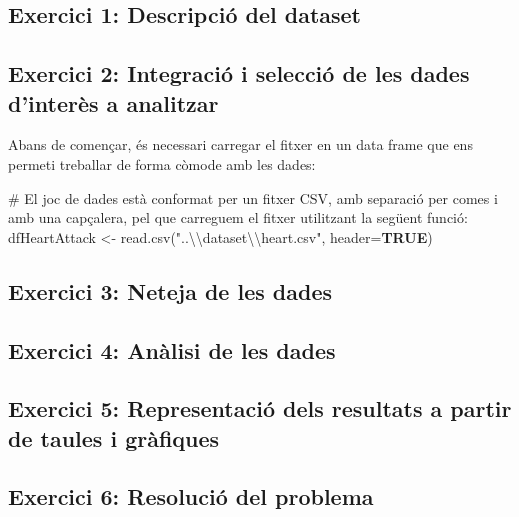 \documentclass[
]{article}
\newenvironment{Shaded}{\begin{snugshade}}{\end{snugshade}}
\newcommand{\AttributeTok}[1]{\textcolor[rgb]{0.80,0.80,0.80}{#1}}
\newcommand{\CommentTok}[1]{\textcolor[rgb]{0.50,0.62,0.50}{#1}}
\newcommand{\ConstantTok}[1]{\textcolor[rgb]{0.86,0.64,0.64}{\textbf{#1}}}
\newcommand{\FunctionTok}[1]{\textcolor[rgb]{0.94,0.94,0.56}{#1}}
\newcommand{\NormalTok}[1]{\textcolor[rgb]{0.80,0.80,0.80}{#1}}
\newcommand{\OtherTok}[1]{\textcolor[rgb]{0.94,0.94,0.56}{#1}}
\newcommand{\SpecialCharTok}[1]{\textcolor[rgb]{0.86,0.64,0.64}{#1}}
\newcommand{\StringTok}[1]{\textcolor[rgb]{0.80,0.58,0.58}{#1}}
\begin{document}
\hypertarget{exercici-1-descripciuxf3-del-dataset}{%
\subsection{Exercici 1: Descripció del
dataset}\label{exercici-1-descripciuxf3-del-dataset}}

\hypertarget{exercici-2-integraciuxf3-i-selecciuxf3-de-les-dades-dinteruxe8s-a-analitzar}{%
\subsection{Exercici 2: Integració i selecció de les dades d'interès a
analitzar}\label{exercici-2-integraciuxf3-i-selecciuxf3-de-les-dades-dinteruxe8s-a-analitzar}}

Abans de començar, és necessari carregar el fitxer en un data frame que
ens permeti treballar de forma còmode amb les dades:

\begin{Shaded}
\begin{Highlighting}[]
\CommentTok{\# El joc de dades està conformat per un fitxer CSV, amb separació per comes i amb una capçalera, pel que carreguem el fitxer utilitzant la següent funció:}
\NormalTok{dfHeartAttack }\OtherTok{\textless{}{-}} \FunctionTok{read.csv}\NormalTok{(}\StringTok{"..}\SpecialCharTok{\textbackslash{}\textbackslash{}}\StringTok{dataset}\SpecialCharTok{\textbackslash{}\textbackslash{}}\StringTok{heart.csv"}\NormalTok{, }\AttributeTok{header=}\ConstantTok{TRUE}\NormalTok{)}
\end{Highlighting}
\end{Shaded}

\hypertarget{exercici-3-neteja-de-les-dades}{%
\subsection{Exercici 3: Neteja de les
dades}\label{exercici-3-neteja-de-les-dades}}

\hypertarget{exercici-4-anuxe0lisi-de-les-dades}{%
\subsection{Exercici 4: Anàlisi de les
dades}\label{exercici-4-anuxe0lisi-de-les-dades}}

\hypertarget{exercici-5-representaciuxf3-dels-resultats-a-partir-de-taules-i-gruxe0fiques}{%
\subsection{Exercici 5: Representació dels resultats a partir de taules
i
gràfiques}\label{exercici-5-representaciuxf3-dels-resultats-a-partir-de-taules-i-gruxe0fiques}}

\hypertarget{exercici-6-resoluciuxf3-del-problema}{%
\subsection{Exercici 6: Resolució del
problema}\label{exercici-6-resoluciuxf3-del-problema}}
\end{document}
